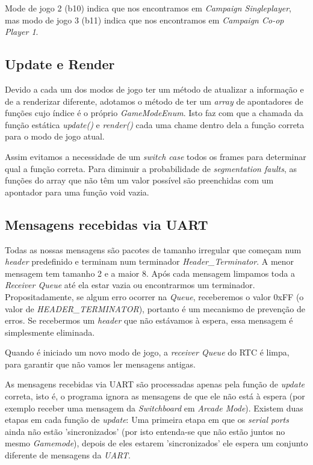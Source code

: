 \documentclass{report}
\begin{document}
Mode de jogo 2 (b10) indica que nos encontramos em \textit{Campaign Singleplayer}, mas modo de jogo 3 (b11) indica que nos encontramos em \textit{Campaign Co-op Player 1}.

\subsection{Update e Render}

Devido a cada um dos modos de jogo ter um método de atualizar a informação e de a renderizar diferente, adotamos o método de ter um \textit{array} de apontadores de funções cujo índice é o próprio \textit{GameModeEnum}. Isto faz com que a chamada da função estática \textit{update()} e \textit{render()} cada uma chame dentro dela a função correta para o modo de jogo atual.

Assim evitamos a necessidade de um \textit{switch case} todos os frames para determinar qual a função correta. Para diminuir a probabilidade de \textit{segmentation faults}, as funções do array que não têm um valor possível são preenchidas com um apontador para uma função void vazia.

\subsection{Mensagens recebidas via UART}

Todas as nossas mensagens são pacotes de tamanho irregular que começam num \textit{header} predefinido e terminam num terminador \textit{Header\_Terminator}. A menor mensagem tem tamanho 2 e a maior 8. Após cada mensagem limpamos toda a \textit{Receiver Queue} até ela estar vazia ou encontrarmos um terminador. Propositadamente, se algum erro ocorrer na \textit{Queue}, receberemos o valor 0xFF (o valor de \textit{HEADER\_TERMINATOR}), portanto é um mecanismo de prevenção de erros. Se recebermos um \textit{header} que não estávamos à espera, essa mensagem é simplesmente eliminada.

Quando é iniciado um novo modo de jogo, a \textit{receiver Queue} do RTC é limpa, para garantir que não vamos ler mensagens antigas.

As mensagens recebidas via UART são processadas apenas pela função de \textit{update} correta, isto é, o programa ignora as mensagens de que ele não está à espera (por exemplo receber uma mensagem da \textit{Switchboard} em \textit{Arcade Mode}).
Existem duas etapas em cada função de \textit{update}: Uma primeira etapa em que os \textit{serial ports} ainda não estão 'sincronizados' (por isto entenda-se que não estão juntos no mesmo \textit{Gamemode}), depois de eles estarem 'sincronizados' ele espera um conjunto diferente de mensagens da \textit{UART}.
\end{document}
